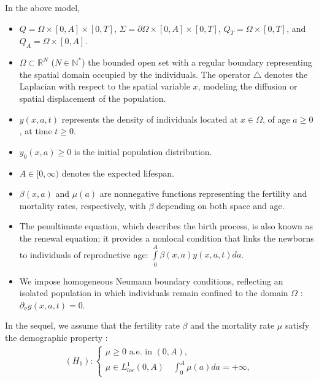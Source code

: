 \documentclass[10pt, a4]{amsart}
\newcounter{assu}
\theoremstyle{plain}
\theoremstyle{definition}
\theoremstyle{remark}
\numberwithin{equation}{section}
\begin{document}
In the above model, 
\begin{itemize}
    \item  \( Q = \Omega \times [0, A] \times [0, T] \), \( \Sigma = \partial\Omega \times [0, A] \times [0, T] \), \( Q_{T} = \Omega \times [0, T] \), and  \( Q_{A} = \Omega \times [0, A] \).
    \item  \( \Omega \subset \mathbb{R}^N \)  (\(N\in\mathbb{N}^*\)) the  bounded open set with a regular boundary representing the spatial domain occupied by the individuals. The operator \( \triangle \) denotes the Laplacian with respect to the spatial variable \( x \), modeling the diffusion or spatial displacement of the population.
    \item   \( y(x, a, t) \) represents the density of individuals located at \( x \in \Omega \), of age \( a \geq 0 \), at time \( t \geq 0 \).
    \item  \( y_0(x, a) \geq 0\) is the initial population distribution.
    \item  \( A \in [0, \infty) \) denotes the expected lifespan.
    \item  \( \beta(x, a) \) and \( \mu(a) \) are nonnegative functions representing the fertility and mortality rates, respectively, with \( \beta \) depending on both space and age.
    \item  The penultimate equation, which describes the birth process, is also known as the renewal equation; it provides a nonlocal condition that links the newborns to individuals of reproductive age: $\displaystyle\int\limits_{0}^{A}\beta(x,a)y(x,a,t)da$.
    \item  We impose homogeneous Neumann boundary conditions, reflecting an isolated population in which individuals remain confined to the domain \( \Omega \) : $\partial_{\nu}y(x,a,t)=0$.
\end{itemize}
In the sequel, we assume that the fertility rate $\beta$ and the mortality rate $\mu$ satisfy the demographic property :
\begin{align*}
(H_1):
\left\lbrace\begin{array}{l}
	\mu\geq 0 \text{ a.e. in } (0,A),\\
	\mu\in L^{1}_{loc}(0,A)\quad \displaystyle\int_{0}^{A}\mu(a)da=+\infty,
\end{array} \right.
\end{align*}
\end{document}
